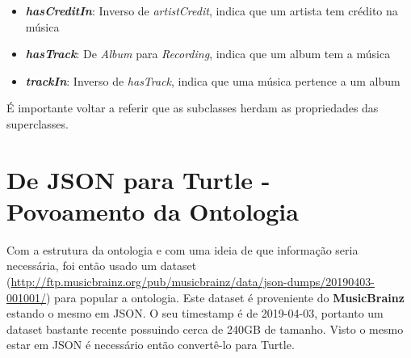 \documentclass{article}
\begin{document}
\begin{itemize}
\begin{itemize}
        \item \textbf{\textit{hasCreditIn}}: Inverso de \textit{artistCredit}, indica que um artista tem crédito na música
        \item \textbf{\textit{hasTrack}}: De \textit{Album} para \textit{Recording}, indica que um album tem a música
        \item \textbf{\textit{trackIn}}: Inverso de \textit{hasTrack}, indica que uma música pertence a um album
    \end{itemize}
\end{itemize}

É importante voltar a referir que as subclasses herdam as propriedades das superclasses.

\section{De JSON para Turtle - Povoamento da Ontologia}

Com a estrutura da ontologia e com uma ideia de que informação seria necessária, foi então usado um dataset (\url{http://ftp.musicbrainz.org/pub/musicbrainz/data/json-dumps/20190403-001001/}) para popular a ontologia. Este dataset é proveniente do \textbf{MusicBrainz} estando o mesmo em JSON. O seu timestamp é de 2019-04-03, portanto um dataset bastante recente possuindo cerca de 240GB de tamanho. Visto o mesmo estar em JSON é necessário então convertê-lo para Turtle.
\end{document}
